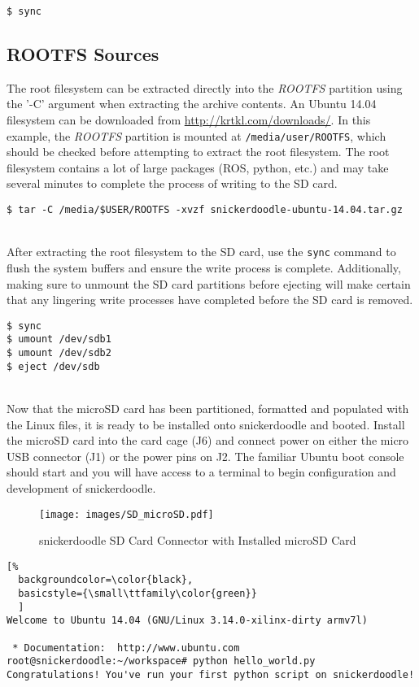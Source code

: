 \begin{lstlisting}
$ sync
\end{lstlisting}

\subsection{ROOTFS Sources}

The root filesystem can be extracted directly into the \textit{ROOTFS} partition using the '-C' argument when extracting the archive contents. An Ubuntu 14.04 filesystem can be downloaded from \url{http://krtkl.com/downloads/}. In this example, the \textit{ROOTFS} partition is mounted at \texttt{/media/user/ROOTFS}, which should be checked before attempting to extract the root filesystem. The root filesystem contains a lot of large packages (ROS, python, etc.) and may take several minutes to complete the process of writing to the SD card. \\

\begin{lstlisting}
$ tar -C /media/$USER/ROOTFS -xvzf snickerdoodle-ubuntu-14.04.tar.gz
\end{lstlisting}


~\\
\noindent
After extracting the root filesystem to the SD card, use the \texttt{sync} command to flush the system buffers and ensure the write process is complete. Additionally, making sure to unmount the SD card partitions before ejecting will make certain that any lingering write processes have completed before the SD card is removed. \\


\begin{lstlisting}
$ sync
$ umount /dev/sdb1
$ umount /dev/sdb2
$ eject /dev/sdb
\end{lstlisting}


~\\
\noindent
Now that the microSD card has been partitioned, formatted and populated with the Linux files, it is ready to be installed onto snickerdoodle and booted. Install the microSD card into the card cage (J6) and connect power on either the micro USB connector (J1) or the power pins on J2. The familiar Ubuntu boot console should start and you will have access to a terminal to begin configuration and development of snickerdoodle. 

\begin{figure}
	\centering
	\texttt{[image: images/SD\_microSD.pdf]}
	\caption{snickerdoodle SD Card Connector with Installed microSD Card}
\end{figure}


\begin{fullwidth}
\begin{lstlisting}[%
  backgroundcolor=\color{black},
  basicstyle={\small\ttfamily\color{green}}
  ]
Welcome to Ubuntu 14.04 (GNU/Linux 3.14.0-xilinx-dirty armv7l)

 * Documentation:  http://www.ubuntu.com
root@snickerdoodle:~/workspace# python hello_world.py 
Congratulations! You've run your first python script on snickerdoodle!
\end{lstlisting}
\end{fullwidth}

